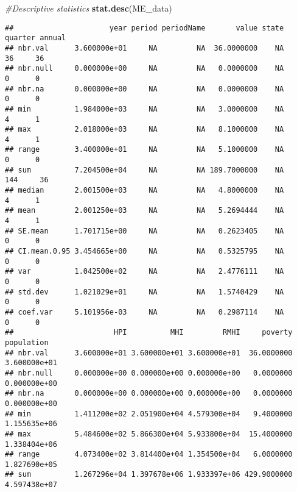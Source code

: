 \documentclass[
]{article}
\newenvironment{Shaded}{\begin{snugshade}}{\end{snugshade}}
\newcommand{\CommentTok}[1]{\textcolor[rgb]{0.56,0.35,0.01}{\textit{#1}}}
\newcommand{\KeywordTok}[1]{\textcolor[rgb]{0.13,0.29,0.53}{\textbf{#1}}}
\newcommand{\NormalTok}[1]{#1}
\newcommand{\OperatorTok}[1]{\textcolor[rgb]{0.81,0.36,0.00}{\textbf{#1}}}
\newcommand{\StringTok}[1]{\textcolor[rgb]{0.31,0.60,0.02}{#1}}
\begin{document}
\begin{Shaded}
\end{Shaded}

\begin{Shaded}
\begin{Highlighting}[]
\CommentTok{#Descriptive statistics}
\KeywordTok{stat.desc}\NormalTok{(ME_data)}
\end{Highlighting}
\end{Shaded}

\begin{verbatim}
##                      year period periodName       value state quarter annual
## nbr.val      3.600000e+01     NA         NA  36.0000000    NA      36     36
## nbr.null     0.000000e+00     NA         NA   0.0000000    NA       0      0
## nbr.na       0.000000e+00     NA         NA   0.0000000    NA       0      0
## min          1.984000e+03     NA         NA   3.0000000    NA       4      1
## max          2.018000e+03     NA         NA   8.1000000    NA       4      1
## range        3.400000e+01     NA         NA   5.1000000    NA       0      0
## sum          7.204500e+04     NA         NA 189.7000000    NA     144     36
## median       2.001500e+03     NA         NA   4.8000000    NA       4      1
## mean         2.001250e+03     NA         NA   5.2694444    NA       4      1
## SE.mean      1.701715e+00     NA         NA   0.2623405    NA       0      0
## CI.mean.0.95 3.454665e+00     NA         NA   0.5325795    NA       0      0
## var          1.042500e+02     NA         NA   2.4776111    NA       0      0
## std.dev      1.021029e+01     NA         NA   1.5740429    NA       0      0
## coef.var     5.101956e-03     NA         NA   0.2987114    NA       0      0
##                       HPI          MHI         RMHI     poverty   population
## nbr.val      3.600000e+01 3.600000e+01 3.600000e+01  36.0000000 3.600000e+01
## nbr.null     0.000000e+00 0.000000e+00 0.000000e+00   0.0000000 0.000000e+00
## nbr.na       0.000000e+00 0.000000e+00 0.000000e+00   0.0000000 0.000000e+00
## min          1.411200e+02 2.051900e+04 4.579300e+04   9.4000000 1.155635e+06
## max          5.484600e+02 5.866300e+04 5.933800e+04  15.4000000 1.338404e+06
## range        4.073400e+02 3.814400e+04 1.354500e+04   6.0000000 1.827690e+05
## sum          1.267296e+04 1.397678e+06 1.933397e+06 429.9000000 4.597438e+07

\end{verbatim}
\end{document}
